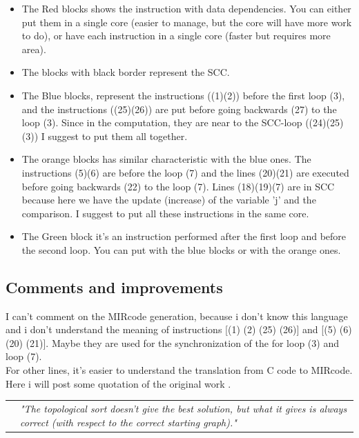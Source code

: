    \begin{itemize}
   	\item The Red blocks shows the instruction with data dependencies. You can either put them in a single core (easier to manage, but the core will have more work to do), or have each instruction in a single core (faster but requires more area).
   	\item The blocks with black border represent the SCC.
   	\item The Blue blocks, represent the instructions ((1)(2)) before the first loop (3), and the instructions ((25)(26)) are put before going backwards (27) to the loop (3). Since in the computation, they are near to the SCC-loop ((24)(25)(3)) I suggest to put them all together.
   	\item The orange blocks has similar characteristic with the blue ones.
   	The instructions (5)(6) are before the loop (7) and the lines (20)(21) are executed before going backwards (22) to the loop (7). Lines (18)(19)(7) are in SCC because here we have the update (increase) of the variable 'j' and the comparison. I suggest to put all these instructions in the same core.
   	\item The Green block it's an instruction performed after the first loop and before the second loop. You can put with the blue blocks or with the orange ones.
   \end{itemize}
   
   \subsection{Comments and improvements}
   I can't comment on the MIRcode generation, because i don't know this language and i don't understand the meaning of instructions [(1) (2) (25) (26)] and [(5) (6) (20) (21)]. Maybe they are used for the synchronization of the for loop (3) and loop (7).\\
   For other lines, it's easier to understand the translation from C code to MIRcode.\\
   
   Here i will post some quotation of the original work \cite{tessa}.\\
   
   \begin{tabular}{ p{0.3cm} p{13.3cm}}
&\textit{"The topological sort doesn't give the best solution, but what it gives is always correct (with respect to the correct starting graph)."} \\
\end{tabular}\\

